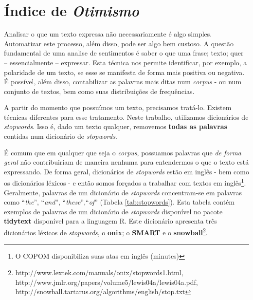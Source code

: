 \section{Índice de \textit{Otimismo}}

Analisar o que um texto expressa não necessariamente é algo simples. Automatizar este processo, além disso, pode ser algo bem custoso. A questão fundamental de uma analise de sentimentos é saber o que uma frase; texto; quer -- essencialmente -- expressar. Esta técnica nos permite identificar, por exemplo, a polaridade de um texto, se esse se manifesta de forma mais positiva ou negativa. É possível, além disso, contabilizar as palavras mais ditas num \textit{corpus} - ou num conjunto de textos, bem como suas distribuições de frequências. 

A partir do momento que possuímos um texto, precisamos tratá-lo. Existem técnicas diferentes para esse tratamento. Neste trabalho, utilizamos dicionários de \textit{stopwords}. Isso é, dado um texto qualquer, removemos \textbf{todas as palavras} contidas num dicionário de \textit{stopwords}. 

É comum que em qualquer que seja o \textit{corpus}, possuamos palavras que \textit{de forma geral} não contribuiriam de maneira nenhuma para entendermos o que o texto está expressando. De forma geral, dicionários de \textit{stopwords} estão em inglês - bem como os dicionários léxicos - e então somos forçados a trabalhar com textos em inglês\footnote{O COPOM disponibiliza suas atas em inglês (minutes)}. Geralmente, palavras de um dicionário de \textit{stopwords} concentram-se em palavras como ``\textit{the}'', ``\textit{and}'', ``\textit{these}'',``\textit{of}'' (Tabela \ref{tab:stopwords}). Esta tabela contém exemplos de palavras de um dicionário de \textit{stopwords} disponível no pacote \textbf{tidytext} \cite{tidystop} disponível para a linguagem R. Este dicionário apresenta três dicionários léxicos de \textit{stopwords}, o \textbf{onix}; o \textbf{SMART} e o \textbf{snowball}\footnote{http://www.lextek.com/manuals/onix/stopwords1.html, http://www.jmlr.org/papers/volume5/lewis04a/lewis04a.pdf, http://snowball.tartarus.org/algorithms/english/stop.txt}. 

